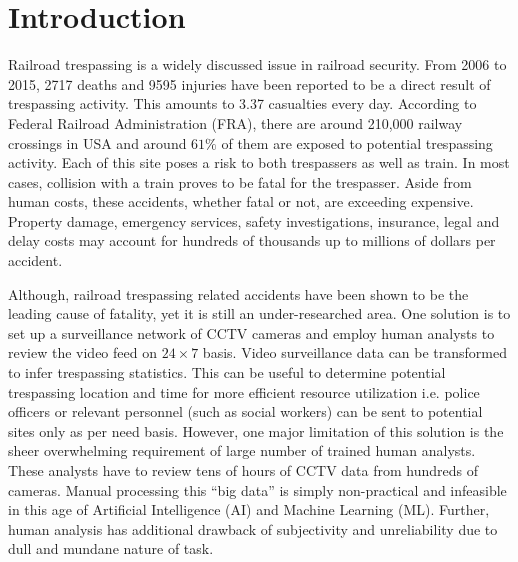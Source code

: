 \section{Introduction}
Railroad trespassing is a widely discussed issue in railroad security. From 2006 to 2015, 2717 deaths and 9595 injuries have been reported to be a direct result of trespassing activity\cite{zhang2018automated}. This amounts to 3.37 casualties every day. According to Federal Railroad Administration (FRA), there are around 210,000 railway crossings in USA and around $61\%$ of them are exposed to potential trespassing activity\cite{zhang2018automated}. Each of this site poses a risk to both trespassers as well as train. In most cases, collision with a train proves to be fatal for the trespasser. Aside from human costs, these accidents, whether fatal or not, are exceeding expensive. Property damage, emergency services, safety investigations, insurance, legal and delay costs may account for hundreds of thousands up to millions of dollars per accident\cite{goldberg1998train}. 

Although, railroad trespassing related accidents have been shown to be the leading cause of fatality\cite{pelletier1997deaths,matzopoulos1998hours,lobb2003evaluation,evans2003accidental}, yet it is still an under-researched area\cite{lobb2006trespassing}. One solution is to set up a surveillance network of CCTV cameras and employ human analysts to review the video feed on $24 \times 7$
basis. Video surveillance data can be transformed to infer trespassing statistics. This can be useful to determine potential trespassing location and time for more efficient resource utilization i.e. police officers or relevant personnel (such as social workers) can be sent to potential sites only as per need basis. However, one major limitation of this solution is the sheer overwhelming requirement of large number of trained human analysts. These analysts have to review tens of hours of CCTV data from hundreds of cameras. Manual processing this ``big data'' is simply non-practical and infeasible in this age of Artificial Intelligence (AI) and Machine Learning (ML). Further, human analysis has additional drawback of subjectivity and unreliability due to dull and mundane nature of task\cite{norouznezhad2008high}.

